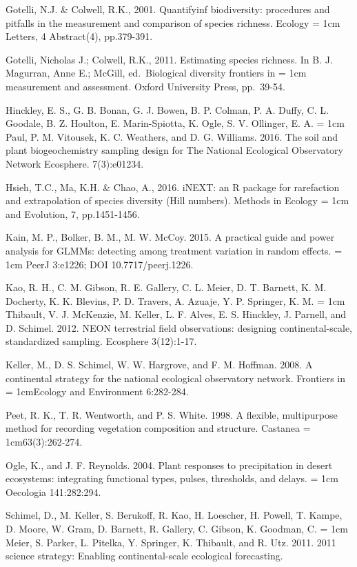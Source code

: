 \documentclass[
  11pt,
]{article}
\begin{document}
Gotelli, N.J. \& Colwell, R.K., 2001. Quantifyinf biodiversity:
procedures and pitfalls in the measurement and comparison of species
richness. Ecology \hangindent= 1cm Letters, 4 Abstract(4), pp.379-391.

Gotelli, Nicholas J.; Colwell, R.K., 2011. Estimating species richness.
In B. J. Magurran, Anne E.; McGill, ed.~Biological diversity frontiers
in \hangindent= 1cm measurement and assessment. Oxford University Press,
pp.~39-54.

Hinckley, E. S., G. B. Bonan, G. J. Bowen, B. P. Colman, P. A. Duffy, C.
L. Goodale, B. Z. Houlton, E. Marin-Spiotta, K. Ogle, S. V. Ollinger, E.
A. \hangindent= 1cm Paul, P. M. Vitousek, K. C. Weathers, and D. G.
Williams. 2016. The soil and plant biogeochemistry sampling design for
The National Ecological Observatory Network Ecosphere. 7(3):e01234.

Hsieh, T.C., Ma, K.H. \& Chao, A., 2016. iNEXT: an R package for
rarefaction and extrapolation of species diversity (Hill numbers).
Methods in Ecology \hangindent= 1cm and Evolution, 7, pp.1451-1456.

Kain, M. P., Bolker, B. M., M. W. McCoy. 2015. A practical guide and
power analysis for GLMMs: detecting among treatment variation in random
effects. \hangindent= 1cm PeerJ 3:e1226; DOI 10.7717/peerj.1226.

Kao, R. H., C. M. Gibson, R. E. Gallery, C. L. Meier, D. T. Barnett, K.
M. Docherty, K. K. Blevins, P. D. Travers, A. Azuaje, Y. P. Springer, K.
M. \hangindent= 1cm Thibault, V. J. McKenzie, M. Keller, L. F. Alves, E.
S. Hinckley, J. Parnell, and D. Schimel. 2012. NEON terrestrial field
observations: designing continental-scale, standardized sampling.
Ecosphere 3(12):1-17.

Keller, M., D. S. Schimel, W. W. Hargrove, and F. M. Hoffman. 2008. A
continental strategy for the national ecological observatory network.
Frontiers in \hangindent= 1cmEcology and Environment 6:282-284.

Peet, R. K., T. R. Wentworth, and P. S. White. 1998. A flexible,
multipurpose method for recording vegetation composition and structure.
Castanea \hangindent= 1cm63(3):262-274.

Ogle, K., and J. F. Reynolds. 2004. Plant responses to precipitation in
desert ecosystems: integrating functional types, pulses, thresholds, and
delays. \hangindent= 1cm Oecologia 141:282:294.

Schimel, D., M. Keller, S. Berukoff, R. Kao, H. Loescher, H. Powell, T.
Kampe, D. Moore, W. Gram, D. Barnett, R. Gallery, C. Gibson, K. Goodman,
C. \hangindent= 1cm Meier, S. Parker, L. Pitelka, Y. Springer, K.
Thibault, and R. Utz. 2011. 2011 science strategy: Enabling
continental-scale ecological forecasting.
\end{document}
